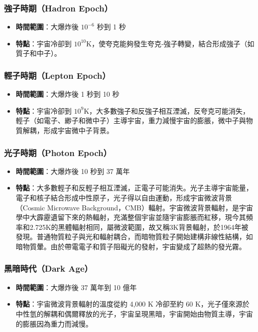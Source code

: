 \documentclass[a4paper,12pt]{report}
\begin{document}
\subsubsection{強子時期（Hadron Epoch）}
\begin{itemize}
\item \textbf{時間範圍}：大爆炸後 \(10^{-6}\) 秒到 1 秒
\item \textbf{特點}：宇宙冷卻到 \(10^{10}\text{K}\)，使夸克能夠發生夸克-強子轉變，結合形成強子（如質子和中子）。
\end{itemize}
\subsubsection{輕子時期（Lepton Epoch）}
\begin{itemize}
\item \textbf{時間範圍}：大爆炸後 1 秒到 10 秒
\item \textbf{特點}：宇宙冷卻到 \(10^{9}\text{K}\)，大多數強子和反強子相互湮滅，反夸克可能消失，輕子（如電子、緲子和微中子）主導宇宙，重力減慢宇宙的膨脹，微中子與物質解耦，形成宇宙微中子背景。
\end{itemize}
\subsubsection{光子時期（Photon Epoch）}
\begin{itemize}
\item \textbf{時間範圍}：大爆炸後 10 秒到 37 萬年
\item \textbf{特點}：大多數輕子和反輕子相互湮滅，正電子可能消失。光子主導宇宙能量，電子和核子結合形成中性原子，光子得以自由運動，形成宇宙微波背景（Cosmic Microwave Background，CMB）輻射。宇宙微波背景輻射，是宇宙學中大霹靂遺留下來的熱輻射，充滿整個宇宙並隨宇宙膨脹而紅移，現今其頻率和2.725K的黑體輻射相同，屬微波範圍，故又稱3K背景輻射，於1964年被發現。普通物質粒子與光和輻射耦合，而暗物質粒子開始建構非線性結構，如暗物質暈。由於帶電電子和質子阻礙光的發射，宇宙變成了超熱的發光霧。
\end{itemize}
\subsubsection{黑暗時代（Dark Age）}
\begin{itemize}
\item \textbf{時間範圍}：大爆炸後 37 萬年到 10 億年
\item \textbf{特點}：宇宙微波背景輻射的溫度從約 4,000 K 冷卻至約 60 K，光子僅來源於中性氫的解耦和偶爾釋放的光子，宇宙呈現黑暗，宇宙開始由物質主導，宇宙的膨脹因為重力而減慢。
\end{itemize}
\end{document}
